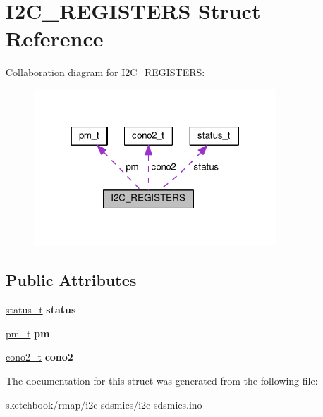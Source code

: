 \hypertarget{structI2C__REGISTERS}{}\section{I2\+C\+\_\+\+R\+E\+G\+I\+S\+T\+E\+RS Struct Reference}
\label{structI2C__REGISTERS}


Collaboration diagram for I2\+C\+\_\+\+R\+E\+G\+I\+S\+T\+E\+RS\+:\nopagebreak
\begin{figure}[H]
\begin{center}
\leavevmode
\includegraphics[width=258pt]{structI2C__REGISTERS__coll__graph}
\end{center}
\end{figure}
\subsection*{Public Attributes}
\begin{DoxyCompactItemize}
\item 
\mbox{\label{structI2C__REGISTERS_a128281a978e61da18bea4e04c0c315f7}} 
\hyperlink{structstatus__t}{status\+\_\+t} {\bfseries status}
\item 
\mbox{\label{structI2C__REGISTERS_a753e6c65523e5fda948523b80a426ee4}} 
\hyperlink{structpm__t}{pm\+\_\+t} {\bfseries pm}
\item 
\mbox{\label{structI2C__REGISTERS_a7dc6c8dcaa6926cd5f758214ec100a58}} 
\hyperlink{structcono2__t}{cono2\+\_\+t} {\bfseries cono2}
\end{DoxyCompactItemize}


The documentation for this struct was generated from the following file\+:\begin{DoxyCompactItemize}
\item 
sketchbook/rmap/i2c-\/sdsmics/i2c-\/sdsmics.\+ino\end{DoxyCompactItemize}
